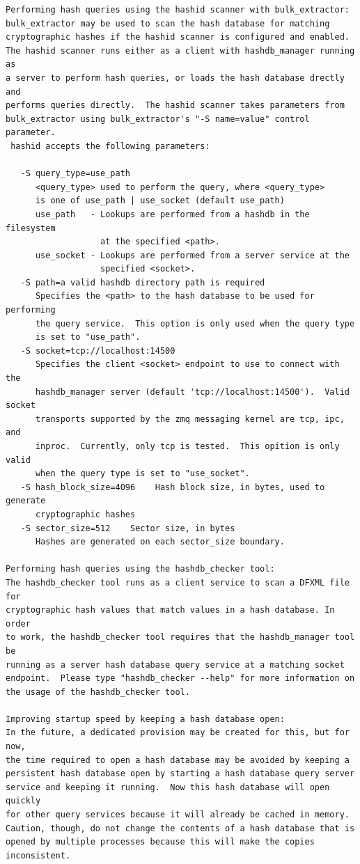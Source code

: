 \documentclass[11pt,twoside]{article}
\begin{document}
\begin{small}
\begin{verbatim}
Performing hash queries using the hashid scanner with bulk_extractor:
bulk_extractor may be used to scan the hash database for matching
cryptographic hashes if the hashid scanner is configured and enabled.
The hashid scanner runs either as a client with hashdb_manager running as
a server to perform hash queries, or loads the hash database drectly and
performs queries directly.  The hashid scanner takes parameters from
bulk_extractor using bulk_extractor's "-S name=value" control parameter.
 hashid accepts the following parameters:

   -S query_type=use_path
      <query_type> used to perform the query, where <query_type>
      is one of use_path | use_socket (default use_path)
      use_path   - Lookups are performed from a hashdb in the filesystem
                   at the specified <path>.
      use_socket - Lookups are performed from a server service at the
                   specified <socket>.
   -S path=a valid hashdb directory path is required
      Specifies the <path> to the hash database to be used for performing
      the query service.  This option is only used when the query type
      is set to "use_path".
   -S socket=tcp://localhost:14500
      Specifies the client <socket> endpoint to use to connect with the
      hashdb_manager server (default 'tcp://localhost:14500').  Valid socket
      transports supported by the zmq messaging kernel are tcp, ipc, and
      inproc.  Currently, only tcp is tested.  This opition is only valid
      when the query type is set to "use_socket".
   -S hash_block_size=4096    Hash block size, in bytes, used to generate
      cryptographic hashes
   -S sector_size=512    Sector size, in bytes
      Hashes are generated on each sector_size boundary.

Performing hash queries using the hashdb_checker tool:
The hashdb_checker tool runs as a client service to scan a DFXML file for
cryptographic hash values that match values in a hash database. In order
to work, the hashdb_checker tool requires that the hashdb_manager tool be
running as a server hash database query service at a matching socket
endpoint.  Please type "hashdb_checker --help" for more information on
the usage of the hashdb_checker tool.

Improving startup speed by keeping a hash database open:
In the future, a dedicated provision may be created for this, but for now,
the time required to open a hash database may be avoided by keeping a
persistent hash database open by starting a hash database query server
service and keeping it running.  Now this hash database will open quickly
for other query services because it will already be cached in memory.
Caution, though, do not change the contents of a hash database that is
opened by multiple processes because this will make the copies inconsistent.


\end{verbatim}
\end{small}
\end{document}
